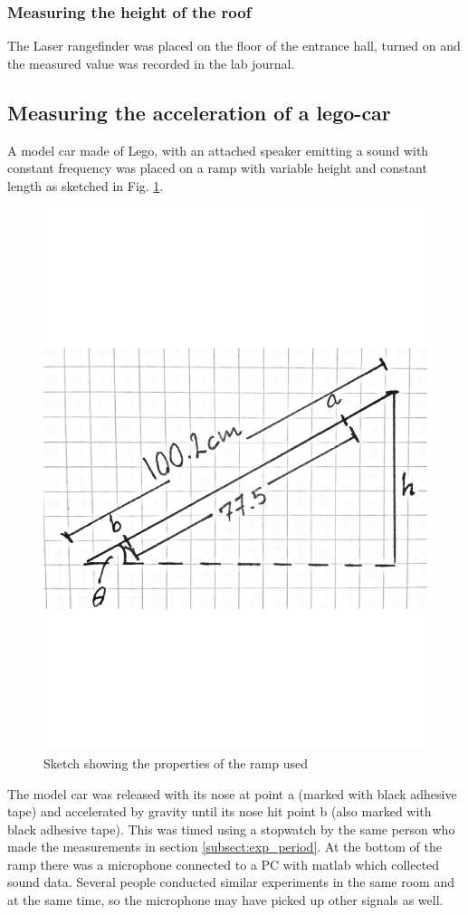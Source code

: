 \documentclass[11pt,a4paper]{article}
\begin{document}
    \subsubsection{Measuring the height of the roof}
      The Laser rangefinder \cite{PLR} was placed on the floor of the entrance hall, turned on and the measured value was recorded in the lab journal.


  \subsection{Measuring the acceleration of a lego-car}
    A model car made of Lego, with an attached speaker emitting a sound with constant frequency was placed on a ramp with variable height and constant length as sketched in Fig. \ref{fig:rampsketch}.
    \begin{figure}[H]
      \center
      \includegraphics[scale=0.3]{scripts/figs/legodiag.pdf}
      \caption{Sketch showing the properties of the ramp used}
      \label{fig:rampsketch}
    \end{figure}
    The model car was released with its nose at point a (marked with black adhesive tape) and accelerated by gravity until its nose hit point b (also marked with black adhesive tape). This was timed using a stopwatch by the same person who made the measurements in section \ref{subsect:exp_period}. At the bottom of the ramp there was a microphone connected to a PC with matlab which collected sound data. Several people conducted similar experiments in the same room and at the same time, so the microphone may have picked up other signals as well.
\end{document}
